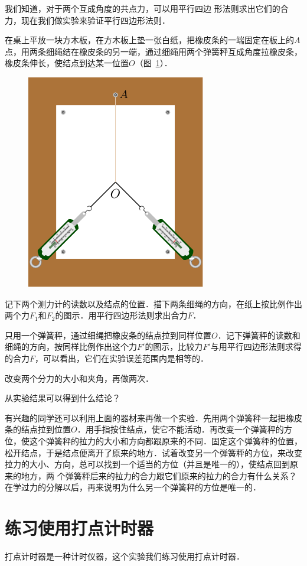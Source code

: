 我们知道，对于两个互成角度的共点力，可以用平行四边
形法则求出它们的合力，现在我们做实验来验证平行四边形法则．
	
在桌上平放一块方木板，在方木板上垫一张白纸，把橡皮条的一端固定在板上的$A$点，用两条细绳结在橡皮条的另一端，通过细绳用两个弹簧秤互成角度拉橡皮条，橡皮条伸长，使结点到达某一位置$O$（图~\ref{fig_A_10-7}）．
\begin{figure}[htbp]
    \centering
    \includegraphics{fig/A/10-7.pdf}
    \caption{}\label{fig_A_10-7}
\end{figure}

记下两个测力计的读数以及结点的位置．描下两条细绳的方向，在纸上按比例作出两个力$F_1$和$F_2$的图示．用平行四边形法则求出合力$F$．

只用一个弹簧秤，通过细绳把橡皮条的结点拉到同样位置$O$．记下弹簧秤的读数和细绳的方向，按同样比例作出这个力$F'$的图示，比较力$F'$与用平行四边形法则求得的合力$F$，可以看出，它们在实验误差范围内是相等的．

改变两个分力的大小和夹角，再做两次．

从实验结果可以得到什么结论？

有兴趣的同学还可以利用上面的器材来再做一个实验．先用两个弹簧秤一起把橡皮条的结点拉到位置$O$．用手指按住结点，使它不能活动．再改变一个弹簧秤的方位，使这个弹簧秤的拉力的大小和方向都跟原来的不同．固定这个弹簧秤的位置，松开结点，于是结点便离开了原来的地方．试着改变另一个弹簧秤的方位，来改变拉力的大小、方向，总可以找到一个适当的方位（并且是唯一的），使结点回到原来的地方，两
个弹簧秤后来的拉力的合力跟它们原来的拉力的合力有什么关系？在学过力的分解以后，再来说明为什么另一个弹簧秤的方位是唯一的．	
	
\section{练习使用打点计时器}
打点计时器是一种计时仪器，这个实验我们练习使用打点计时器．

